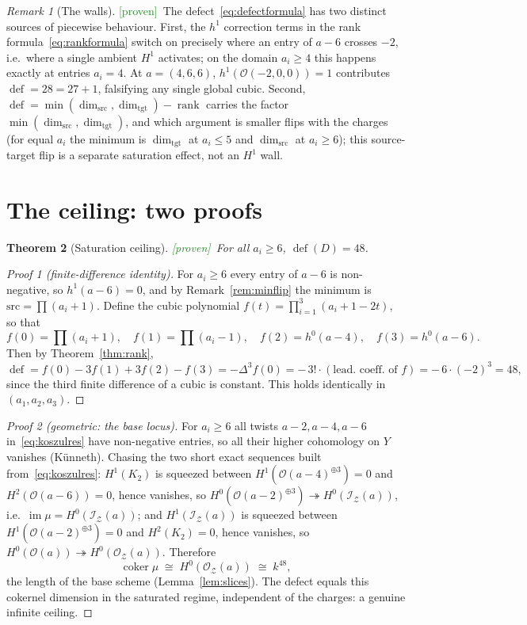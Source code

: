 \documentclass[11pt]{article}
\theoremstyle{plain}
\newtheorem{theorem}{Theorem}[section]
\theoremstyle{definition}
\theoremstyle{remark}
\newtheorem{remark}[theorem]{Remark}
\newcommand{\Proven}{\textcolor{ForestGreen}{\textsf{[proven]}}}
\newcommand{\cO}{\mathcal{O}}
\newcommand{\cI}{\mathcal{I}}
\newcommand{\cZ}{\mathcal{Z}}
\newcommand{\defect}{\operatorname{def}}
\DeclareMathOperator{\Coker}{coker}
\begin{document}
\begin{remark}[The walls]\label{rem:walls}
\Proven\ The defect~\eqref{eq:defectformula} has two distinct sources of piecewise behaviour. First, the $h^1$ correction terms in the rank formula~\eqref{eq:rankformula} switch on precisely where an entry of $a-6$ crosses $-2$, i.e.\ where a single ambient $H^1$ activates; on the domain $a_i\ge4$ this happens exactly at entries $a_i=4$. At $a=(4,6,6)$, $h^1(\cO(-2,0,0))=1$ contributes $\defect=28=27+1$, falsifying any single global cubic. Second, $\defect=\min(\dim_{\mathrm{src}},\dim_{\mathrm{tgt}})-\operatorname{rank}$ carries the factor $\min(\dim_{\mathrm{src}},\dim_{\mathrm{tgt}})$, and which argument is smaller flips with the charges (for equal $a_i$ the minimum is $\dim_{\mathrm{tgt}}$ at $a_i\le5$ and $\dim_{\mathrm{src}}$ at $a_i\ge6$); this source-target flip is a separate saturation effect, not an $H^1$ wall.
\end{remark}

\section{The ceiling: two proofs}\label{sec:ceiling}

\begin{theorem}[Saturation ceiling]\label{thm:ceiling}
\Proven\ For all $a_i\ge 6$, $\defect(D)=48$.
\end{theorem}

\begin{proof}[Proof 1 (finite-difference identity)]
For $a_i\ge 6$ every entry of $a-6$ is non-negative, so $h^1(a-6)=0$, and by Remark~\ref{rem:minflip} the minimum is $\mathrm{src}=\prod(a_i+1)$. Define the cubic polynomial $f(t)=\prod_{i=1}^3(a_i+1-2t)$, so that
\[
f(0)=\textstyle\prod(a_i+1),\quad f(1)=\prod(a_i-1),\quad f(2)=h^0(a-4),\quad f(3)=h^0(a-6).
\]
Then by Theorem~\ref{thm:rank},
\[
\defect = f(0)-3f(1)+3f(2)-f(3) = -\Delta^3 f(0)
= -\,3!\cdot(\text{lead.\ coeff.\ of }f) = -\,6\cdot(-2)^3 = 48,
\]
since the third finite difference of a cubic is constant. This holds identically in $(a_1,a_2,a_3)$.
\end{proof}

\begin{proof}[Proof 2 (geometric: the base locus)]
For $a_i\ge 6$ all twists $a-2,a-4,a-6$ in~\eqref{eq:koszulres} have non-negative entries, so all their higher cohomology on $Y$ vanishes (K\"unneth). Chasing the two short exact sequences built from~\eqref{eq:koszulres}: $H^1(K_2)$ is squeezed between $H^1(\cO(a-4)^{\oplus3})=0$ and $H^2(\cO(a-6))=0$, hence vanishes, so $H^0(\cO(a-2)^{\oplus3})\twoheadrightarrow H^0(\cI_{\cZ}(a))$, i.e.\ $\operatorname{im}\mu=H^0(\cI_\cZ(a))$; and $H^1(\cI_\cZ(a))$ is squeezed between $H^1(\cO(a-2)^{\oplus3})=0$ and $H^2(K_2)=0$, hence vanishes, so $H^0(\cO(a))\twoheadrightarrow H^0(\cO_\cZ(a))$. Therefore
\[
\Coker\mu\;\cong\;H^0(\cO_{\cZ}(a))\;\cong\;k^{48},
\]
the length of the base scheme (Lemma~\ref{lem:slices}). The defect equals this cokernel dimension in the saturated regime, independent of the charges: a genuine infinite ceiling.
\end{proof}
\end{document}
